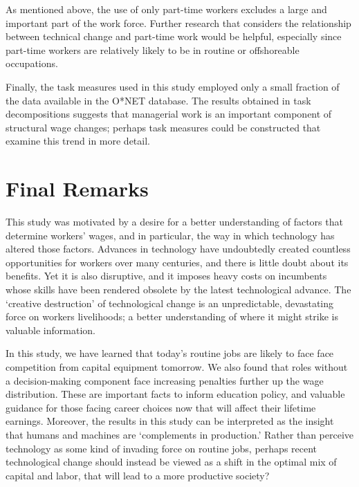 As mentioned above, the use of only part-time workers excludes a large and important part of the work force. Further research that considers the relationship between technical change and part-time work would be helpful, especially since part-time workers are relatively likely to be in routine or offshoreable occupations.

Finally, the task measures used in this study employed only a small fraction of the data available in the O*NET database. The results obtained in task decompositions suggests that managerial work is an important component of structural wage changes; perhaps task measures could be constructed that examine this trend in more detail.

\section{Final Remarks}

This study was motivated by a desire for a better understanding of factors that determine workers' wages, and in particular, the way in which technology has altered those factors. Advances in technology have undoubtedly created countless opportunities for workers over many centuries, and there is little doubt about its benefits. Yet it is also disruptive, and it imposes heavy costs on incumbents whose skills have been rendered obsolete by the latest technological advance. The `creative destruction' of technological change is an unpredictable, devastating force on workers livelihoods;  a better understanding of where it might strike is valuable information.

In this study, we have learned that  today's routine jobs are likely to face face competition from capital equipment tomorrow. We also found that roles without a decision-making component face increasing penalties further up the wage distribution. These are important facts to inform education policy, and valuable guidance for those facing career choices now that will affect their lifetime earnings. Moreover, the results in this study can be interpreted as the insight that humans and machines are `complements in production.'  Rather than perceive technology as some kind of invading force on routine jobs, perhaps recent technological change should instead be viewed as a shift in the optimal mix of capital and labor, that will lead to a more productive society?

